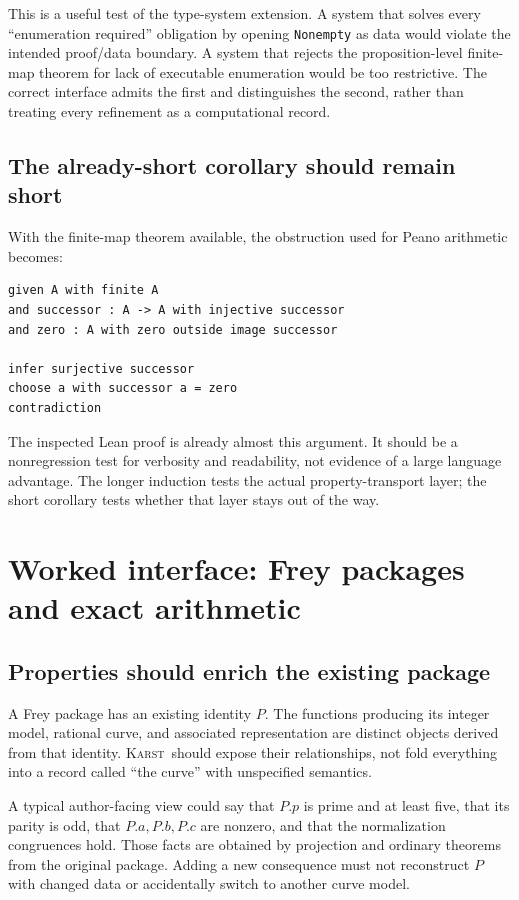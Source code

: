 \documentclass[11pt,letterpaper]{article}
\newcommand{\code}[1]{\nolinkurl{#1}}
\newcommand{\Karst}{\textsc{Karst}}
\theoremstyle{remark}
\begin{document}
This is a useful test of the type-system extension. A system that solves every
``enumeration required'' obligation by opening \code{Nonempty} as data would
violate the intended proof/data boundary. A system that rejects the
proposition-level finite-map theorem for lack of executable enumeration would
be too restrictive. The correct interface admits the first and distinguishes
the second, rather than treating every refinement as a computational record.

\subsection{The already-short corollary should remain short}
With the finite-map theorem available, the obstruction used for Peano
arithmetic becomes:
\begin{lstlisting}[caption={A concise corollary, with no invented proof machinery.}]
given A with finite A
and successor : A -> A with injective successor
and zero : A with zero outside image successor

infer surjective successor
choose a with successor a = zero
contradiction
\end{lstlisting}

The inspected Lean proof is already almost this argument. It should be a
nonregression test for verbosity and readability, not evidence of a large
language advantage. The longer induction tests the actual property-transport
layer; the short corollary tests whether that layer stays out of the way.

\section{Worked interface: Frey packages and exact arithmetic}\label{sec:frey}

\subsection{Properties should enrich the existing package}
A Frey package has an existing identity $P$. The functions producing its
integer model, rational curve, and associated representation are distinct
objects derived from that identity. \Karst\ should expose their relationships,
not fold everything into a record called ``the curve'' with unspecified
semantics.

A typical author-facing view could say that $P.p$ is prime and at least five,
that its parity is odd, that $P.a,P.b,P.c$ are nonzero, and that the
normalization congruences hold. Those facts are obtained by projection and
ordinary theorems from the original package. Adding a new consequence must
not reconstruct $P$ with changed data or accidentally switch to another curve
model.
\end{document}
